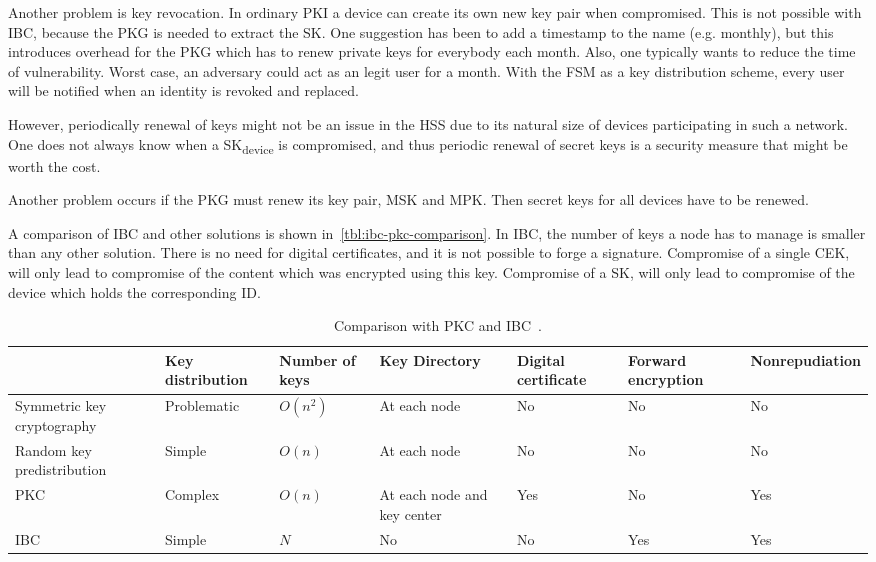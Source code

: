 Another problem is key revocation.
In ordinary \gls{PKI} a device can create its own new key pair when compromised. 
This is not possible with \gls{IBC}, because the \gls{PKG} is needed to extract the \gls{SK}.
One suggestion has been to add a timestamp to the \gls{name} (e.g. monthly), but this introduces overhead for the \gls{PKG} which has to renew private keys for everybody each month. 
Also, one typically wants to reduce the time of vulnerability. 
Worst case, an adversary could act as an legit user for a month.
With the \gls{FSM} as a key distribution scheme, every user will be notified when an identity is revoked and replaced.

However, periodically renewal of keys might not be an issue in the \gls{HSS} due to its natural size of devices participating in such a network.
One does not always know when a SK\textsubscript{device} is compromised, and thus periodic renewal of secret keys is a security measure that might be worth the cost.

Another problem occurs if the \gls{PKG} must renew its key pair, \gls{MSK} and \gls{MPK}.
Then secret keys for all devices have to be renewed.

A comparison of \gls{IBC} and other solutions is shown in~\autoref{tbl:ibc-pkc-comparison}.
In \gls{IBC}, the number of keys a node has to manage is smaller than any other solution. 
There is no need for digital certificates, and it is not possible to forge a signature.
Compromise of a single \gls{CEK}, will only lead to compromise of the content which was encrypted using this key.
Compromise of a \gls{SK}, will only lead to compromise of the device which holds the corresponding ID.
\begin{table}[h]\footnotesize
  \begin{tabular}[c]{ | p{2cm} | p{1.5cm} | p{1cm} | p{1.2cm} | p{1cm} | p{1.3cm} | p{1.8cm} |}
  \hline 
  & Key distribution & Number of keys & Key Directory & Digital certificate & Forward encryption & Nonrepudiation  \\ \hline
  Symmetric key cryptography 	 & Problematic 	   & $O(n^2)$ 	& At each node 					        & No 	& No 	& No 	   \\ \hline 
  Random key predistribution 	 & Simple 		     & $O(n)$ 	  & At each node 					        & No 	& No 	& No 	   \\ \hline
  PKC 							           & Complex 		     & $O(n)$ 	  & At each node and key center 	& Yes & No 	& Yes 	 \\ \hline
  IBC 							           & Simple 		     & $N$ 		    & No 							              & No 	& Yes & Yes 	 \\ \hline
  \end{tabular}
  \caption[Comparison with PKC and IBC]{Comparison with PKC and IBC~\cite[Table 9.6]{Patil:2012:SWS:2464778}.}
  \label{tbl:ibc-pkc-comparison}
\end{table}

